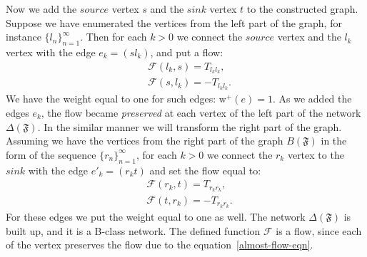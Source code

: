 \documentclass[12pt]{article}
\theoremstyle{definition}
\newtheorem{remark}{Remark}
\newtheorem{definition}{Definition}
\newcommand{\seq}[1]{\{{#1}_n\}_{n=1}^\infty}
\newcommand{\fsys}{\mathfrak{F}}
\newcommand{\wtp}{\mathrm{w}^{+}}
\newcommand{\flow}{\mathcal{F}}
\newcommand{\source}{\mathit{source}}
\newcommand{\sink}{\mathit{sink}}
\newcommand{\net}{\Delta}
\numberwithin{remark}{section}
\numberwithin{theorem}{section}
\numberwithin{prop}{section}
\numberwithin{equation}{section}
\numberwithin{lemma}{section}
\numberwithin{prop_under_lemma}{lemma}
\begin{document}
    Now we add the $\source$ vertex $s$ and the $\sink$ vertex $t$ to the constructed graph.
    Suppose we have enumerated the vertices from the left part of the graph, for instance $\seq{l}$.
    Then for each $k > 0$ we connect the $\source$ vertex and the $l_k$ vertex with
      the edge $e_k = (s l_k)$, and put a flow:
    \begin{align*}
      &\flow(l_k, s) = T_{l_k l_k},\\
      &\flow(s, l_k) = -T_{l_k l_k}.
    \end{align*}
    We have the weight equal to one for such edges: $\wtp(e) = 1$.
    As we added the edges ${e_k}$, the flow became \emph{preserved} at each vertex of the left part of the network $\net(\fsys)$.
    In the similar manner we will transform the right part of the graph.
    Assuming we have the vertices from the right part of the graph $B(\fsys)$ in the form of the sequence $\seq{r}$,
      for each $k > 0$ we connect the $r_k$ vertex to the $\sink$ with the edge $e'_k=(r_k t)$
      and set the flow equal to:
    \begin{align*}
      &\flow(r_k, t) = T_{r_k r_k},\\
      &\flow(t, r_k) = -T_{r_k r_k}.
    \end{align*}
    For these edges we put the weight equal to one as well.
    The network $\net(\fsys)$ is built up, and it is a B-class network.
    The defined function $\flow$ is a flow, since each of the vertex preserves
      the flow due to the equation~\eqref{almost-flow-eqn}.
\end{document}
